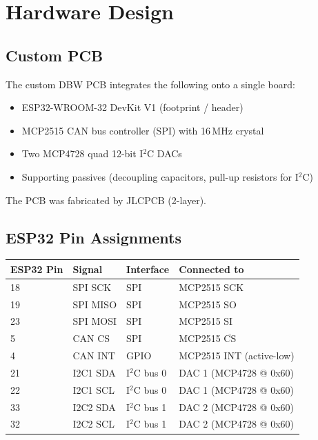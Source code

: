 \documentclass[12pt, letterpaper]{article}
\begin{document}
\section{Hardware Design}

\subsection{Custom PCB}

The custom DBW PCB integrates the following onto a single board:

\begin{itemize}
  \item ESP32-WROOM-32 DevKit V1 (footprint / header)
  \item MCP2515 CAN bus controller (SPI) with 16\,MHz crystal
  \item Two MCP4728 quad 12-bit I$^2$C DACs
  \item Supporting passives (decoupling capacitors, pull-up resistors for I$^2$C)
\end{itemize}

The PCB was fabricated by JLCPCB (2-layer).

\subsection{ESP32 Pin Assignments}

\begin{center}
\begin{tabular}{llll}
  \toprule
  \textbf{ESP32 Pin} & \textbf{Signal} & \textbf{Interface} & \textbf{Connected to} \\
  \midrule
  18  & SPI SCK  & SPI  & MCP2515 SCK \\
  19  & SPI MISO & SPI  & MCP2515 SO \\
  23  & SPI MOSI & SPI  & MCP2515 SI \\
  5   & CAN CS   & SPI  & MCP2515 \(\overline{\text{CS}}\) \\
  4   & CAN INT  & GPIO & MCP2515 INT (active-low) \\
  21  & I2C1 SDA & I$^2$C bus 0 & DAC 1 (MCP4728 @ 0x60) \\
  22  & I2C1 SCL & I$^2$C bus 0 & DAC 1 (MCP4728 @ 0x60) \\
  33  & I2C2 SDA & I$^2$C bus 1 & DAC 2 (MCP4728 @ 0x60) \\
  32  & I2C2 SCL & I$^2$C bus 1 & DAC 2 (MCP4728 @ 0x60) \\
  \bottomrule
\end{tabular}
\end{center}
\end{document}
